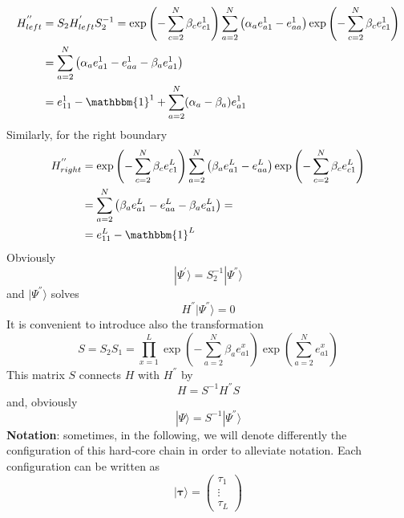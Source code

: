 \documentclass[11pt]{article}
\numberwithin{equation}{section}
\numberwithin{equation}{subsection}
\begin{document}
\begin{equation}
	\begin{split}
		H_{left}^{''}&=S_{2}H_{left}^{'}S_{2}^{-1}=\exp{\left(-\sum_{c=2}^{N}\beta_{c}e_{c1}^{1}\right)}\sum_{a=2}^{N}\left(\alpha_{a}e_{a1}^{1}-e_{aa}^{1}\right)\exp{\left(-\sum_{c=2}^{N}\beta_{c}e_{c1}^{1}\right)}
		\\&=
		\sum_{a=2}^{N}\left(\alpha_{a}e_{a1}^{1}-e_{aa}^{1}-\beta_{a}e_{a1}^{1}\right)
		\\&=
		e_{11}^{1}-\mathbbm{1}^{1}+\sum_{a=2}^{N}(\alpha_{a}-\beta_{a})e_{a1}^{1}
	\end{split}
\end{equation}
Similarly, for the right boundary
\begin{equation}
	\begin{split}
			H_{right}^{''}&=\exp{\left(-\sum_{c=2}^{N}\beta_{c}e_{c1}^{L}\right)}\sum_{a=2}^{N}\left(\beta_{a}e_{a1}^{L}-e_{aa}^{L}\right)\exp{\left(-\sum_{c=2}^{N}\beta_{c}e_{c1}^{L}\right)}
			\\&=
			\sum_{a=2}^{N}\left(\beta_{a}e_{a1}^{L}-e_{aa}^{L}-\beta_{a}e_{a1}^{L}\right)=
			\\&=
			e_{11}^{L}-\mathbbm{1}^{L}
	\end{split}
\end{equation}
Obviously
\begin{equation}\label{S2-Inverse}
	|\Psi^{'}\rangle = S_{2}^{-1}|\Psi^{''}\rangle
\end{equation}
and $|\Psi^{''}\rangle$ solves
\begin{equation}
	H^{''}|\Psi^{''}\rangle=0
\end{equation}
It is convenient to introduce also the transformation
\begin{equation}\label{similarity}
	S=S_{2}S_{1}=\prod_{x=1}^{L}\exp{\left(-\sum_{a=2}^{N}\beta_{a}e_{a1}^{x}\right)}\exp{\left(\sum_{a=2}^{N}e_{a1}^{x}\right)}
\end{equation}
This matrix $S$ connects $H$ with $H^{''}$ by 
\begin{equation}
H=S^{-1}H^{''}S
\end{equation}
and, obviously
\begin{equation}
	|\Psi\rangle=S^{-1}|\Psi^{''}\rangle
\end{equation}
\textbf{Notation}: sometimes, in the following, we will denote differently the configuration of this hard-core chain in order to alleviate notation. Each configuration can be written as
\begin{equation}
	|\bm{\tau}\rangle =\begin{pmatrix}
		\tau_{1}\\
		\vdots\\
		\tau_{L}
	\end{pmatrix}
\end{equation}
\end{document}

